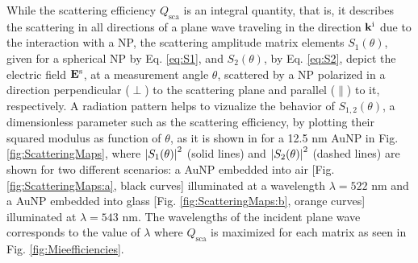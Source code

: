 While the scattering efficiency $Q_\text{sca}$ is an integral quantity, that is, it describes the scattering in all directions of a plane wave traveling in the  direction $\vb{k}^\text{i}$ due to the interaction with a NP, the scattering amplitude matrix elements $S_1(\theta)$,  given  for a spherical NP by Eq. \eqref{eq:S1}, and  $S_2(\theta)$, by Eq. \eqref{eq:S2}, depict the  electric field $\vb{E}^\text{s}$, at a measurement angle $\theta$,  scattered by a NP polarized in a direction perpendicular ($\perp$) to the scattering plane and parallel ($\parallel$) to it, respectively. A radiation pattern helps to vizualize the behavior of $S_{1,2}(\theta)$, a dimensionless parameter such as the scattering efficiency, by plotting their squared modulus as function of $\theta$, as it is shown in for a 12.5 nm AuNP in Fig. \ref{fig:ScatteringMaps}, where $\abs{S_{1}(\theta)}^2$ (solid lines) and $\abs{S_2(\theta)}^2$ (dashed lines) are shown for two different scenarios: a AuNP embedded into air [Fig. \ref{fig:ScatteringMaps:a}, black curves]  illuminated  at a wavelength $\lambda = 522$ nm and a AuNP embedded into glass  [Fig. \ref{fig:ScatteringMaps:b}, orange curves]  illuminated at $\lambda = 543$ nm. The wavelengths of the incident plane wave corresponds to the value of $\lambda$ where $Q_\text{sca}$ is maximized for each matrix as seen in Fig. \ref{fig:Mieefficiencies}.

